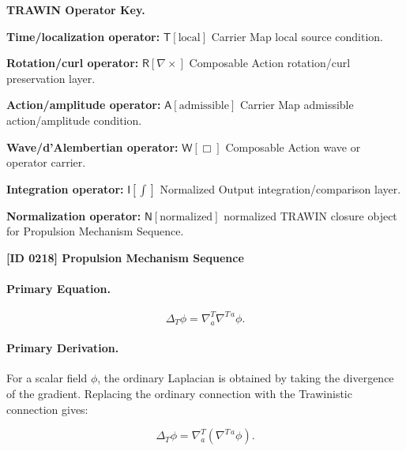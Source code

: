 \par\vspace{0.45\baselineskip}
\noindent\begin{minipage}[t]{\linewidth}
\begingroup
\small
\raggedright
\textbf{TRAWIN Operator Key.}\par
\noindent\textbf{Time/localization operator:} $\mathsf{T}\!\left[\mathrm{local}\right]$ Carrier Map local source condition.\par
\noindent\textbf{Rotation/curl operator:} $\mathsf{R}\!\left[\nabla\times\right]$ Composable Action rotation/curl preservation layer.\par
\noindent\textbf{Action/amplitude operator:} $\mathsf{A}\!\left[\mathrm{admissible}\right]$ Carrier Map admissible action/amplitude condition.\par
\noindent\textbf{Wave/d'Alembertian operator:} $\mathsf{W}\!\left[\Box\right]$ Composable Action wave or operator carrier.\par
\noindent\textbf{Integration operator:} $\mathsf{I}\!\left[\int\right]$ Normalized Output integration/comparison layer.\par
\noindent\textbf{Normalization operator:} $\mathsf{N}\!\left[\mathrm{normalized}\right]$ normalized TRAWIN closure object for Propulsion Mechanism Sequence.\par
\endgroup
\end{minipage}

\clearpage
\noindent\textbf{[ID 0218] Propulsion Mechanism Sequence}\par
\vspace{0.35em}
\paragraph{Primary Equation.}
\begin{equation}
\Delta_T\phi
=
\nabla^{T}_{a}\nabla^{T\,a}\phi .
\end{equation}

\paragraph{Primary Derivation.}
For a scalar field $\phi$, the ordinary Laplacian is obtained by taking the divergence of the gradient.  
Replacing the ordinary connection with the Trawinistic connection gives:

\begin{equation}
\Delta_T\phi
=
\nabla^{T}_{a}
\left(
\nabla^{T\,a}\phi
\right).
\end{equation}

